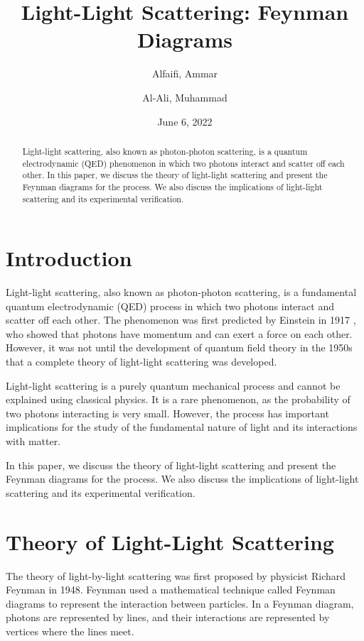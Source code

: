 \documentclass{article}
\title{Light-Light Scattering: Feynman Diagrams}
\author{Alfaifi, Ammar \and Al-Ali, Muhammad}
\date{June 6, 2022}
\begin{document}
\maketitle

\begin{abstract}
	Light-light scattering, also known as photon-photon scattering, is a quantum electrodynamic (QED) phenomenon in which two photons interact and scatter off each other. In this paper, we discuss the theory of light-light scattering and present the Feynman diagrams for the process. We also discuss the implications of light-light scattering and its experimental verification.
\end{abstract}

\section{Introduction}

Light-light scattering, also known as photon-photon scattering, is a fundamental quantum electrodynamic (QED) process in which two photons interact and scatter off each other. The phenomenon was first predicted by Einstein in 1917 \cite{einstein1917theory}, who showed that photons have momentum and can exert a force on each other. However, it was not until the development of quantum field theory in the 1950s that a complete theory of light-light scattering was developed.

Light-light scattering is a purely quantum mechanical process and cannot be explained using classical physics. It is a rare phenomenon, as the probability of two photons interacting is very small. However, the process has important implications for the study of the fundamental nature of light and its interactions with matter.

In this paper, we discuss the theory of light-light scattering and present the Feynman diagrams for the process. We also discuss the implications of light-light scattering and its experimental verification.

\section{Theory of Light-Light Scattering}

The theory of light-by-light scattering was first proposed by physicist Richard Feynman in 1948. Feynman used a mathematical technique called Feynman diagrams to represent the interaction between particles. In a Feynman diagram, photons are represented by lines, and their interactions are represented by vertices where the lines meet.
\end{document}
